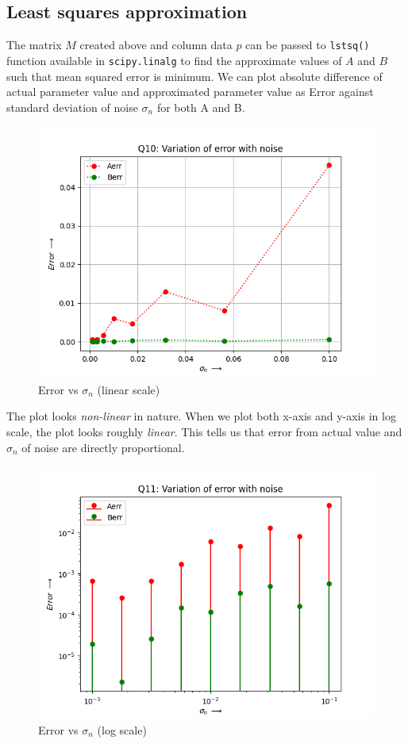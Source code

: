\documentclass[12pt, a4paper]{report}
\begin{document}
\subsection*{Least squares approximation}
 The matrix $M$ created above and column data $p$ can be passed to \texttt{lstsq()} function available in \texttt{scipy.linalg} to find the approximate values of $A$ and $B$ such that mean squared error is minimum. We can plot absolute difference of actual parameter value and approximated parameter value as Error against standard deviation of noise $\sigma_n$ for both A and B.
 \begin{figure}[H]
 \centering
	\includegraphics[scale=0.8]{Figure_5.png}  %
	\caption{Error vs $\sigma_n$ (linear scale)}
	\label{fig5}
 \end{figure}
 The plot looks \textit{non-linear} in nature. When we plot both x-axis and y-axis in log scale, the plot looks roughly \textit{linear}. This tells us that error from actual value and $\sigma_n$ of noise are directly proportional.
 \begin{figure}[H]
 \centering
	\includegraphics[scale=0.8]{Figure_6.png}  %
	\caption{Error vs $\sigma_n$ (log scale)}
	\label{fig6}
 \end{figure}
   
\end{document}
